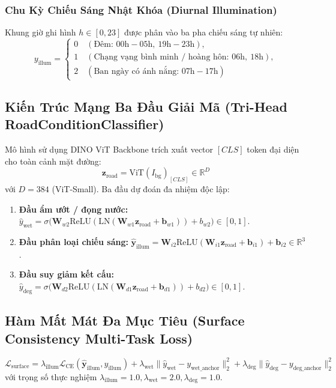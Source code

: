 \documentclass[11pt,a4paper]{article}
\begin{document}
\subsubsection{Chu Kỳ Chiếu Sáng Nhật Khóa (Diurnal Illumination)}
Khung giờ ghi hình $h \in [0, 23]$ được phân vào ba pha chiếu sáng tự nhiên:
\begin{equation}
    y_{\text{illum}} = \begin{cases} 
    0 \quad (\text{Đêm: } 00\text{h}-05\text{h}, \ 19\text{h}-23\text{h}), \\ 
    1 \quad (\text{Chạng vạng bình minh / hoàng hôn: } 06\text{h}, \ 18\text{h}), \\ 
    2 \quad (\text{Ban ngày có ánh nắng: } 07\text{h}-17\text{h}) 
    \end{cases}
\end{equation}

\subsection{Kiến Trúc Mạng Ba Đầu Giải Mã (Tri-Head RoadConditionClassifier)}
Mô hình sử dụng DINO ViT Backbone trích xuất vector $[CLS]$ token đại diện cho toàn cảnh mặt đường:
\begin{equation}
    \mathbf{z}_{\text{road}} = \text{ViT}(I_{\text{bg}})_{[CLS]} \in \mathbb{R}^D
\end{equation}
với $D = 384$ (ViT-Small). Ba đầu dự đoán đa nhiệm độc lập:
\begin{enumerate}
    \item \textbf{Đầu ẩm ướt / đọng nước:} $\hat{y}_{\text{wet}} = \sigma\big(\mathbf{W}_{w2} \text{ReLU}(\text{LN}(\mathbf{W}_{w1} \mathbf{z}_{\text{road}} + \mathbf{b}_{w1})) + b_{w2}\big) \in [0, 1]$.
    \item \textbf{Đầu phân loại chiếu sáng:} $\hat{\mathbf{y}}_{\text{illum}} = \mathbf{W}_{i2} \text{ReLU}(\mathbf{W}_{i1} \mathbf{z}_{\text{road}} + \mathbf{b}_{i1}) + \mathbf{b}_{i2} \in \mathbb{R}^3$.
    \item \textbf{Đầu suy giảm kết cấu:} $\hat{y}_{\text{deg}} = \sigma\big(\mathbf{W}_{d2} \text{ReLU}(\text{LN}(\mathbf{W}_{d1} \mathbf{z}_{\text{road}} + \mathbf{b}_{d1})) + b_{d2}\big) \in [0, 1]$.
\end{enumerate}

\subsection{Hàm Mất Mát Đa Mục Tiêu (Surface Consistency Multi-Task Loss)}
\begin{equation}
    \mathcal{L}_{\text{surface}} = \lambda_{\text{illum}} \mathcal{L}_{\text{CE}}(\hat{\mathbf{y}}_{\text{illum}}, y_{\text{illum}}) + \lambda_{\text{wet}} \|\hat{y}_{\text{wet}} - y_{\text{wet\_anchor}}\|_2^2 + \lambda_{\text{deg}} \|\hat{y}_{\text{deg}} - y_{\text{deg\_anchor}}\|_2^2
\end{equation}
với trọng số thực nghiệm $\lambda_{\text{illum}} = 1.0, \lambda_{\text{wet}} = 2.0, \lambda_{\text{deg}} = 1.0$.
\end{document}

